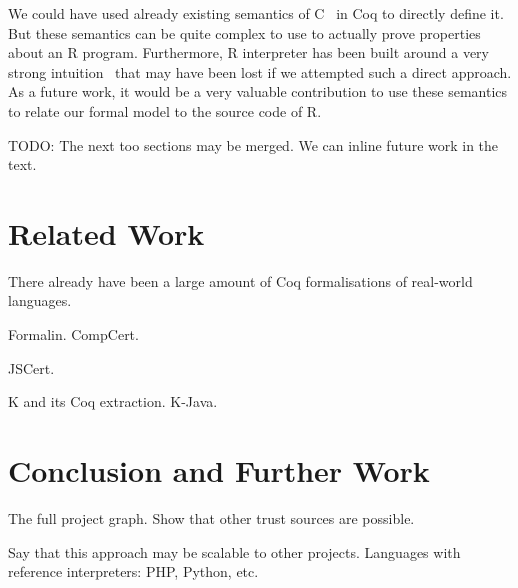 \documentclass[9pt, sigplan, natbib=false, screen=true]{acmart}
\newcommand\Coq{Coq}
\newcommand\R{R}
\newcommand\Cn{C}
\begin{document}
We could have used already existing semantics
of \Cn{}~\parencite{formalin, Leroy-Compcert-CACM} in \Coq{}
to directly define it.
But these semantics can be quite complex to use
to actually prove properties about an \R{} program.
Furthermore, \R{} interpreter has been built
around a very strong intuition~\parencite{ihaka1996r}
that may have been lost if we attempted such a direct approach.
As a future work, it would be a very valuable contribution
to use these semantics to relate
our formal model to the source code of \R{}.


TODO: The next too sections may be merged. We can inline future work in the text.
\section{Related Work}
\label{sec:related:work}

There already have been a large amount of \Coq{} formalisations
of real-world languages.

Formalin.
CompCert.

JSCert.

K and its \Coq{} extraction.
K-Java.


\section{Conclusion and Further Work}
\label{sec:conclusion}

The full project graph.
Show that other trust sources are possible.

Say that this approach may be scalable to other projects.
Languages with reference interpreters:
PHP, Python, etc.


\printbibliography
\end{document}
